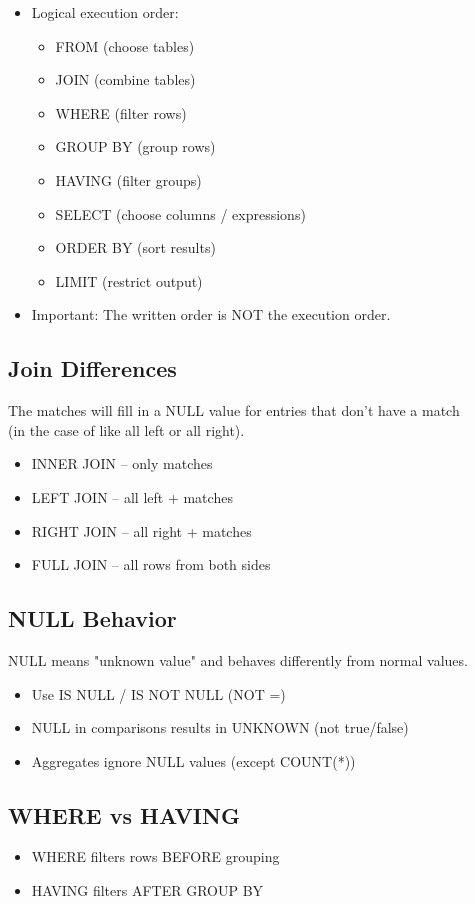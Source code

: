 \documentclass[10pt]{article}
\begin{document}
\begin{itemize}
\item Logical execution order:
    \begin{itemize}
    \item FROM (choose tables)
    \item JOIN (combine tables)
    \item WHERE (filter rows)
    \item GROUP BY (group rows)
    \item HAVING (filter groups)
    \item SELECT (choose columns / expressions)
    \item ORDER BY (sort results)
    \item LIMIT (restrict output)
    \end{itemize}
\item Important: The written order is NOT the execution order.
\end{itemize}

\newpage
\subsection{Join Differences}
The matches will fill in a NULL value for entries that don't have a match\\ 
(in the case of like all left or all right).
\begin{itemize}
\item INNER JOIN -- only matches
\item LEFT JOIN -- all left + matches
\item RIGHT JOIN -- all right + matches
\item FULL JOIN -- all rows from both sides
\end{itemize}

\subsection{NULL Behavior}
NULL means "unknown value" and behaves differently from normal values.
\begin{itemize}
\item Use IS NULL / IS NOT NULL (NOT =)
\item NULL in comparisons results in UNKNOWN (not true/false)
\item Aggregates ignore NULL values (except COUNT(*))
\end{itemize}

\subsection{WHERE vs HAVING}
\begin{itemize}
\item WHERE filters rows BEFORE grouping
\item HAVING filters AFTER GROUP BY
\end{itemize}
\end{document}
